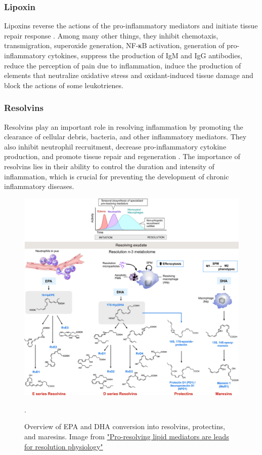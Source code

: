 \subsubsection{Lipoxin}

Lipoxins reverse the actions of the pro-inflammatory mediators and initiate tissue repair response \cite{Basil2015}. Among many other things, they inhibit chemotaxis, transmigration, superoxide generation, NF-κB activation, generation of pro-inflammatory cytokines, suppress the production of IgM and IgG antibodies, reduce the perception of pain due to inflammation, induce the production of elements that neutralize oxidative stress and oxidant-induced tissue damage and block the actions of some leukotrienes. \cite{Sharmawalia2015}

\subsubsection{Resolvins}

Resolvins play an important role in resolving inflammation by promoting the clearance of cellular debris, bacteria, and other inflammatory mediators. They also inhibit neutrophil recruitment, decrease pro-inflammatory cytokine production, and promote tissue repair and regeneration \cite{Moro2016}. The importance of resolvins lies in their ability to control the duration and intensity of inflammation, which is crucial for preventing the development of chronic inflammatory diseases.

        \begin{figure}[h!]
            \centering
                \includegraphics[width=0.8\linewidth]{figures/Inflammation/nihms646633f2.jpg}
            \caption{Overview of EPA and DHA conversion into resolvins, protectins, and maresins. Image from \href{https://www.nature.com/articles/nature13479}{"Pro-resolving lipid mediators are leads for resolution physiology"}}.
        \label{figure:Eicosanoids2}
        \end{figure}  


